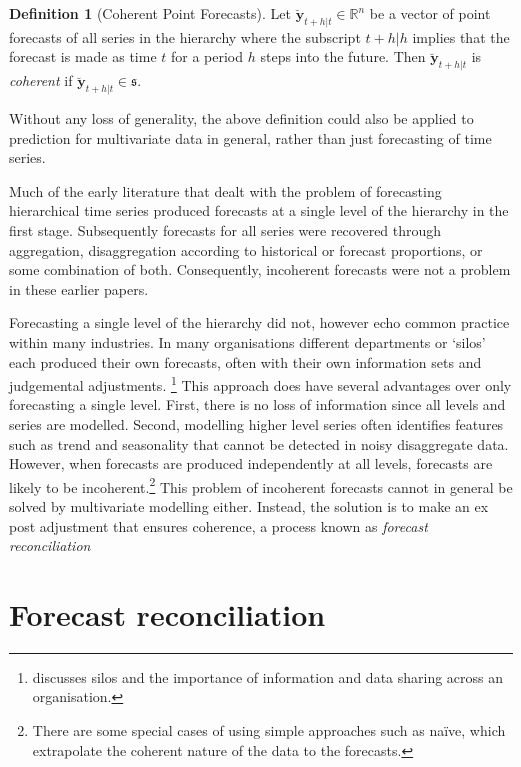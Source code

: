 \documentclass[12pt]{article}
\theoremstyle{definition}
\newtheorem{definition}{Definition}[section]
\begin{document}
	\begin{definition}[Coherent Point Forecasts]\label{def:cohpoint}
        Let $\breve{\bm{y}}_{t+h|t} \in \mathbb{R}^n$ be a vector of point forecasts of all series in the hierarchy where the subscript $t+h|h$ implies that the forecast is made as time $t$ for a period $h$ steps into the future. Then $\breve{\bm{y}}_{t+h|t}$ is \emph{coherent} if $\breve{\bm{y}}_{t+h|t} \in \mathfrak{s}$.
	\end{definition}

    Without any loss of generality, the above definition could also be applied to prediction for multivariate data in general, rather than just forecasting of time series.

Much of the early literature that dealt with the problem of forecasting hierarchical time series \citep[see][and references therein]{Gross1990} produced forecasts at a single level of the hierarchy in the first stage. Subsequently forecasts for all series were recovered through aggregation, disaggregation according to historical or forecast proportions, or some combination of both. Consequently, incoherent forecasts were not a problem in these earlier papers.

Forecasting a single level of the hierarchy did not, however echo common practice within many industries. In many organisations different departments or `silos' each produced their own forecasts, often with their own information sets and judgemental adjustments. \footnote{\citet{Cha2013} discusses silos and the importance of information and data sharing across an organisation.} This approach does have several advantages over only forecasting a single level. First, there is no loss of information since all levels and series are modelled. Second, modelling higher level series often identifies features such as trend and seasonality that cannot be detected in noisy disaggregate data. However, when forecasts are produced independently at all levels, forecasts are likely to be incoherent.\footnote{There are some special cases of using simple approaches such as na\"{i}ve, which extrapolate the coherent nature of the data to the forecasts.} This problem of incoherent forecasts cannot in general be solved by multivariate modelling either. Instead, the solution is to make an ex post adjustment that ensures coherence, a process known as \emph{forecast reconciliation}

\section{Forecast reconciliation}\label{sec:Reconciliation}
\end{document}
